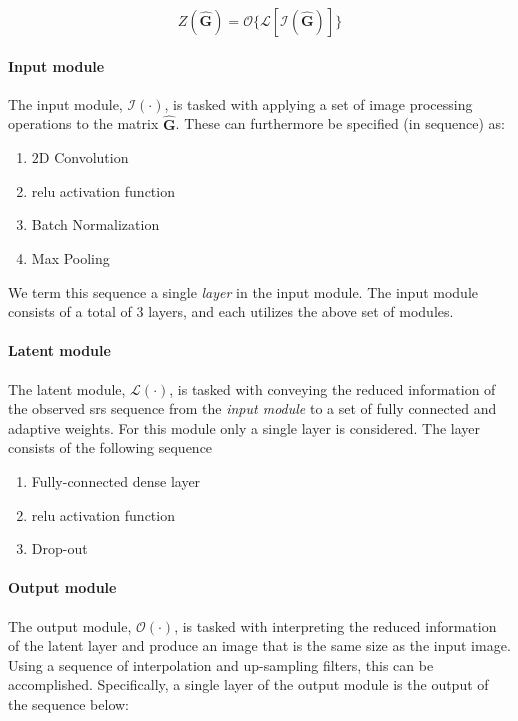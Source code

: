 \begin{equation}
    Z(\mathbf{\hat{G}}) = \mathcal{O}\{\mathcal{L}[\mathcal{I}(\mathbf{\hat{G}})]\}
\end{equation}

\paragraph{Input module}
The input module, $\mathcal{I}(\cdot)$, is tasked with applying a set of image processing operations to the matrix $\mathbf{\hat{G}}$. These can furthermore be specified (in sequence) as:

\begin{enumerate}
    \item $2$D Convolution
    \item \gls{relu} activation function
    \item Batch Normalization
    \item Max Pooling
\end{enumerate}

We term this sequence a single \emph{layer} in the input module. The input module consists of a total of $3$ layers, and each utilizes the above set of modules.

\paragraph{Latent module}
The latent module, $\mathcal{L}(\cdot)$, is tasked with conveying the reduced information of the observed \gls{srs} sequence from the \textit{input module} to a set of fully connected and adaptive weights. For this module only a single layer is considered. The layer consists of the following sequence
\begin{enumerate}
    \item Fully-connected dense layer
    \item \gls{relu} activation function
    \item Drop-out
\end{enumerate}

\paragraph{Output module}
The output module, $\mathcal{O}(\cdot)$, is tasked with interpreting the reduced information of the latent layer and produce an image that is the same size as the input image. Using a sequence of interpolation and up-sampling filters, this can be accomplished. Specifically, a single layer of the output module is the output of the sequence below:

